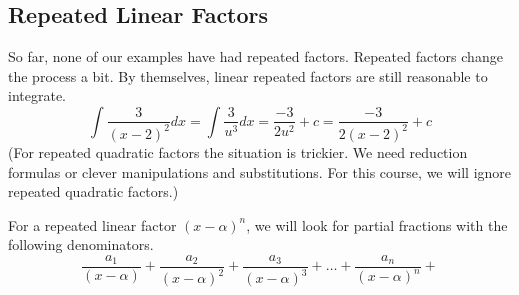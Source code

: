 \documentclass[fleqn]{report}
\begin{document}
\subsection{Repeated Linear Factors}
\label{repeated-linear-factors}

So far, none of our examples have had repeated factors.
Repeated factors change the process a bit. By themselves,
linear repeated factors are still reasonable to integrate.
\begin{equation*}
\int \frac{3}{(x-2)^2} dx = \int \frac{3}{u^3} dx =
\frac{-3}{2u^2} + c = \frac{-3}{2 (x-2)^2} + c 
\end{equation*}
(For repeated quadratic factors the situation is trickier.
We need reduction formulas or clever manipulations and
substitutions. For this course, we will ignore repeated
quadratic factors.)

For a repeated linear factor $(x-\alpha)^n$, we will look for partial
fractions with the following denominators.
\begin{equation*}
\frac{a_1}{(x-\alpha)} + 
\frac{a_2}{(x-\alpha)^2} + 
\frac{a_3}{(x-\alpha)^3} + \ldots + 
\frac{a_n}{(x-\alpha)^n} + 
\end{equation*}
\end{document}
